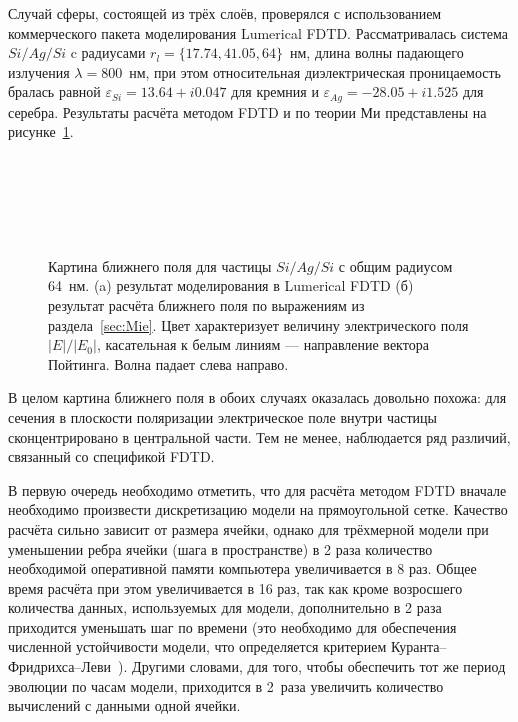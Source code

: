 Случай сферы, состоящей из трёх слоёв, проверялся с использованием
коммерческого пакета моделирования Lumerical FDTD. Рассматривалась
система $Si/Ag/Si$ c радиусами $r_l=\{17.74, 41.05, 64\}$~нм, длина
волны падающего излучения $\lambda = 800$~нм, при этом относительная
диэлектрическая проницаемость бралась равной
$\varepsilon_{Si} = 13.64 + i 0.047$ для кремния и
$\varepsilon_{Ag} = -28.05 + i 1.525$ для серебра.  Результаты расчёта
методом FDTD и по теории Ми представлены на рисунке~\ref{img:fdtd}.
\begin{figure}[p] %
  \begin{minipage}[ht]{0.99\linewidth}        
  \end{minipage}\\
  \vfill
  \begin{minipage}[ht]{0.99\linewidth}        
  \end{minipage}\\
  \vfill
  \begin{minipage}[ht]{0.99\linewidth}
  \end{minipage}\\
  \vfill
  \begin{minipage}[ht]{0.99\linewidth}
  \end{minipage}
  \caption{Картина ближнего поля для частицы $Si/Ag/Si$ с общим
    радиусом 64~нм. (a) результат моделирования в Lumerical FDTD (б)
    результат расчёта ближнего поля по выражениям из
    раздела~\ref{sec:Mie}. Цвет характеризует величину электрического
    поля $|E|/|E_0|$, касательная к белым линиям --- направление вектора
    Пойтинга. Волна падает слева направо.\label{img:fdtd}}
\end{figure}

В целом картина ближнего поля в обоих случаях оказалась довольно
похожа: для сечения в плоскости поляризации электрическое поле внутри
частицы сконцентрировано в центральной части. Тем не менее,
наблюдается ряд различий, связанный со спецификой FDTD.

В первую очередь необходимо отметить, что для расчёта методом FDTD
вначале необходимо произвести дискретизацию модели на прямоугольной
сетке. Качество расчёта сильно зависит от размера ячейки, однако для
трёхмерной модели при уменьшении ребра ячейки (шага в пространстве) в
2 раза количество необходимой оперативной памяти компьютера
увеличивается в 8 раз.  Общее время расчёта при этом увеличивается в
16 раз, так как кроме возросшего количества данных, используемых для
модели, дополнительно в 2 раза приходится уменьшать шаг по времени
(это необходимо для обеспечения численной устойчивости модели, что
определяется критерием
Куранта--Фридрихса--Леви~\cite{Courant-1941}). Другими словами, для
того, чтобы обеспечить тот же период эволюции по часам модели,
приходится в 2~раза увеличить количество вычислений с данными одной
ячейки.

